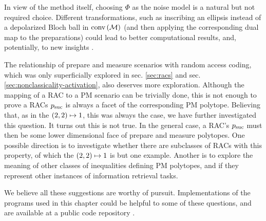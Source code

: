         In view of the method itself, choosing $\Phi$ as the noise model is a natural but not required choice. Different transformations, such as inscribing an ellipsis instead of a depolarized Bloch ball in $\text{conv} \left( \mathcal{M} \right)$ (and then applying the corresponding dual map to the preparations) could lead to better computational results, and, potentially, to new insights \cite{fillettaz_algorithmic_2018}.

		The relationship of prepare and measure scenarios with random access coding, which was only superficially explored in sec. \ref{sec:racs} and sec. \ref{sec:nonclassicality-activation}, also deserves more exploration. Although the mapping of a RAC to a PM scenario can be trivially done, this is not enough to prove a RACs $p_{\text{suc}}$ is always a facet of the corresponding PM polytope. Believing that, as in the $\left( 2, 2 \right) \mapsto 1$, this was always the case, we have further investigated this question. It turns out this is not true. In the general case, a RAC's $p_{\text{suc}}$ must then be some lower dimensional face of prepare and measure polytopes. One possible direction is to investigate whether there are subclasses of RACs with this property, of which the $\left( 2, 2 \right) \mapsto 1$ is but one example. Another is to explore the meaning of other classes of inequalities defining PM polytopes, and if they represent other instances of information retrieval tasks.

        We believe all these suggestions are worthy of pursuit. Implementations of the programs used in this chapter could be helpful to some of these questions, and are available at a public code repository \cite{classicality_repository}.